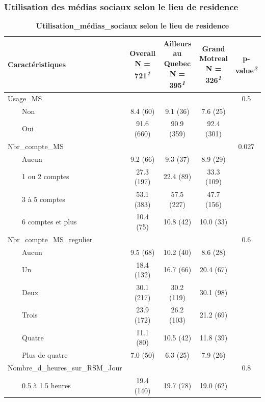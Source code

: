 \documentclass[
]{article}
\begin{document}
\hypertarget{utilisation-des-muxe9dias-sociaux-selon-le-lieu-de-residence}{%
\subsubsection{Utilisation des médias sociaux selon le lieu de
residence}\label{utilisation-des-muxe9dias-sociaux-selon-le-lieu-de-residence}}

\newpage
\begin{table}[!t]
\caption{\label{tab:unnamed-chunk-10}\textbf{Utilisation\_médias\_sociaux selon le lieu de residence}} 
\fontsize{12.0pt}{14.4pt}\selectfont
\begin{tabular*}{\linewidth}{@{\extracolsep{\fill}}lcccc}
\toprule
\textbf{Caractéristiques} & \textbf{Overall}  N = 721\textsuperscript{\textit{1}} & \textbf{Ailleurs au Quebec}  N = 395\textsuperscript{\textit{1}} & \textbf{Grand Motreal}  N = 326\textsuperscript{\textit{1}} & \textbf{p-value}\textsuperscript{\textit{2}} \\ 
\midrule\addlinespace[2.5pt]
Usage\_MS &  &  &  & 0.5 \\ 
    Non & 8.4 (60) & 9.1 (36) & 7.6 (25) &  \\ 
    Oui & 91.6 (660) & 90.9 (359) & 92.4 (301) &  \\ 
Nbr\_compte\_MS &  &  &  & 0.027 \\ 
    Aucun & 9.2 (66) & 9.3 (37) & 8.9 (29) &  \\ 
    1 ou 2 comptes & 27.3 (197) & 22.4 (89) & 33.3 (109) &  \\ 
    3 à 5 comptes & 53.1 (383) & 57.5 (227) & 47.7 (156) &  \\ 
    6 comptes et plus & 10.4 (75) & 10.8 (42) & 10.0 (33) &  \\ 
Nbr\_compte\_MS\_regulier &  &  &  & 0.6 \\ 
    Aucun & 9.5 (68) & 10.2 (40) & 8.6 (28) &  \\ 
    Un & 18.4 (132) & 16.7 (66) & 20.4 (67) &  \\ 
    Deux & 30.1 (217) & 30.2 (119) & 30.1 (98) &  \\ 
    Trois & 23.9 (172) & 26.2 (103) & 21.2 (69) &  \\ 
    Quatre & 11.1 (80) & 10.5 (42) & 11.8 (39) &  \\ 
    Plus de quatre & 7.0 (50) & 6.3 (25) & 7.9 (26) &  \\ 
Nombre\_d\_heures\_sur\_RSM\_Jour &  &  &  & 0.8 \\ 
    0.5 à 1.5 heures & 19.4 (140) & 19.7 (78) & 19.0 (62) &  \\ 

\end{tabular*}
\end{table}
\end{document}
